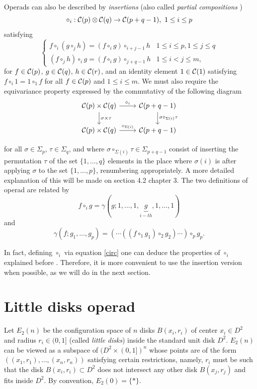 \documentclass[TFM.tex]{subfiles}
\begin{document}
Operads can also be described by \emph{insertions} (also called \emph{partial compositions} \cite{das})
\[
\circ_i:\mathcal{C}(p)\otimes\mathcal{C}(q)\to \mathcal{C}(p+q-1),\ 1\leq i\leq p
\]
satisfying 
\[
\begin{cases}
f\circ_i(g\circ_j h)=(f\circ_i g)\circ_{i+j-1} h & 1\leq i\leq p, 1\leq j\leq q\\
(f\circ_j h)\circ_i g=(f\circ_i g)\circ_{j+q-1}h & 1\leq i<j\leq m,
\end{cases}
\]
for $f\in\mathcal{C}(p)$, $g\in\mathcal{C}(q)$, $h\in\mathcal{C}(r)$, and an identity element $1\in\mathcal{C}(1)$ satisfying $f\circ_i 1=1\circ_1 f$ for all $f\in\mathcal{C}(p)$ and $1\leq i\leq m$. We must also require the equivariance property expressed by the commutativy of the following diagram
\[
\begin{tikzcd}
\CC(p)\times \CC(q)\arrow[r, "\circ_i"]\arrow[d, "\sigma\times\tau"] & \CC(p+q-1)\arrow[d, "\sigma\circ_{\Sigma(i)}\tau"]\\
\CC(p)\times\CC(q)\arrow[r, "\circ_{\Sigma(i)}"] & \CC(p+q-1)
\end{tikzcd}
\]

for all $\sigma\in\Sigma_p$, $\tau\in\Sigma_q$, and where $\sigma\circ_{\Sigma(i)}\tau\in\Sigma_{p+q-1}$ consist of inserting the permutation $\tau$ of the set $\{1,\dots, q\}$ elements in the place where $\sigma(i)$ is after applying $\sigma$ to the set $\{1,\dots, p\}$, renumbering appropriately. A more detailed explanation of this will be made on section 4.2 chapter 3. The two definitions of operad are related by
\begin{equation}\label{circ}
f\circ_i g=\gamma(g;1,\dots, 1,\underbrace{g}_{i-th},1,\dots, 1)
\end{equation}
and
\[
\gamma(f;g_1,\dots, g_p)= (\cdots((f\circ_1 g_1)\circ_{2} g_{2})\cdots)\circ_p g_p.
\]

In fact, defining $\circ_i$ via equation \ref{circ} one can deduce the properties of $\circ_i$ explained before \cite[Chapter 2]{teich}. Therefore, it is more convenient to use the insertion version when possible, as we will do in the next section. 



\section{Little disks operad}\label{little}
 
 
 Let $E_2(n)$ be the configuration space of $n$ disks $B(x_i,r_i)$ of center $x_i\in D^2$ and radius $r_i\in (0,1]$ (called \emph{little disks}) inside the standard unit disk $D^2$. $E_2(n)$ can be viewed as a subspace of $(D^2\times (0,1])^n$ whose points are of the form $((x_1,r_1),\dots, (x_n,r_n))$ satisfying certain restrictions, namely, $r_i$ must be such that the disk $B(x_i,r_i)\subset D^2$ does not intersect any other disk $B(x_j,r_j)$ and fits inside $D^2$. By convention, $E_2(0)=\{*\}$.  
 
\end{document}
